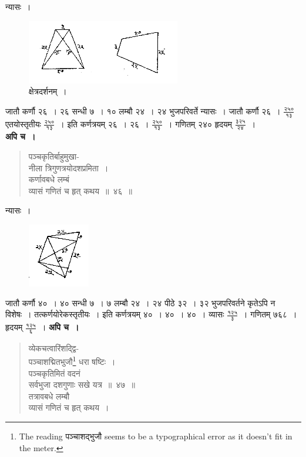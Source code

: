 \documentclass[11pt, openany]{book}
\begin{document}
 न्यासः~। 

\begin{figure}[h!]
    \centering
   \captionsetup{labelformat=empty}
    \caption{क्षेत्रदर्शनम्~।}
\vspace{-2mm}

    \includegraphics[scale=0.85]{graphics/capture57.png}
\end{figure}
\vspace{-2mm}

\newpage

 जातौ कर्णौ २६~। २६ सन्धी ७~। १० लम्बौ २४~। २४ भुजपरिवर्ते
न्यासः~। जातौ कर्णौ २६~। 
$\frac{\mbox{२५०}}{\mbox{१३}}$ एतयोस्तृतीयः $\frac{\mbox{२५०}}{\mbox{१३}}$~। इति 
कर्णत्रयम् २६~। २६~। $\frac{\mbox{२५०}}{\mbox{१३}}$~। गणितम् २४० हृदयम् 
$\frac{\mbox{३२५}}{\mbox{२४}}$~। \\

 \textbf{अपि च~।} 
\begin{quote}
    \bqt 
     पञ्चकृतिर्बाहुमुखा-\\
     नीला त्रिगुणत्रयोदशप्रमिता~।\\
कर्णावबधे लम्बं \\
व्यासं गणितं च हृत् कथय~॥~४६~॥
\end{quote}

 न्यासः~। 
\vspace{-2mm}

\begin{figure}[h!]
    \centering
    \includegraphics[scale=0.85]{graphics/capture58.png}
\end{figure}
\vspace{-2mm}

 जातौ कर्णौ ४०~। ४० सन्धी ७~। ७ लम्बौ २४~। २४ पीठे ३२~। ३२ 
भुजपरिवर्तने कृतेऽपि न विशेषः~। तत्कर्णयोरेकस्तृतीयः~। इति 
कर्णत्रयम् ४०~। ४०~। ४०~। व्यासः 
$\frac{\mbox{१२५}}{\mbox{३}}$~। गणितम् ७६८~। हृदयम्
$\frac{\mbox{१२५}}{\mbox{६}}$~। 
\newpage
 \textbf{अपि च~।} 
\begin{quote}
    \bqt 
    व्येकचत्वारिंशद्द्वि-\\
    पञ्चाशद्मितभुजौ\footnote{The reading पञ्चाशद्भुजौ seems to be a typographical error as it doesn't fit in the meter.} धरा षष्टिः~।\\
पञ्चकृतिमितं वदनं \\
सर्वभुजा दशगुणाः सखे यत्र~॥~४७~॥\\
तत्रावबधे लम्बौ \\
व्यासं गणितं च हृत् कथय~।
\end{quote}
\end{document}
